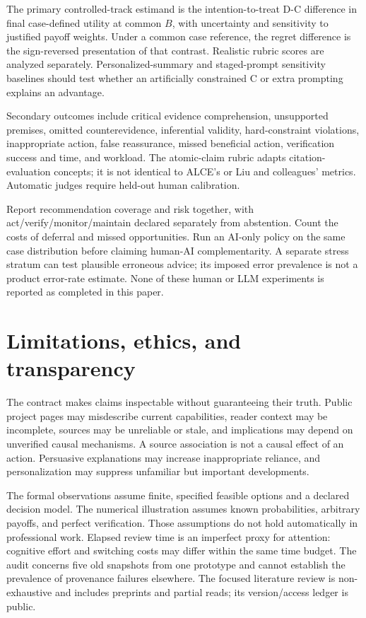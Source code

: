 \documentclass[11pt]{article}
\begin{document}
The primary controlled-track estimand is the intention-to-treat D-C difference in final case-defined utility at common $B$, with uncertainty and sensitivity to justified payoff weights. Under a common case reference, the regret difference is the sign-reversed presentation of that contrast. Realistic rubric scores are analyzed separately. Personalized-summary and staged-prompt sensitivity baselines should test whether an artificially constrained C or extra prompting explains an advantage.

Secondary outcomes include critical evidence comprehension, unsupported premises, omitted counterevidence, inferential validity, hard-constraint violations, inappropriate action, false reassurance, missed beneficial action, verification success and time, and workload. The atomic-claim rubric adapts citation-evaluation concepts; it is not identical to ALCE's or Liu and colleagues' metrics. Automatic judges require held-out human calibration.

Report recommendation coverage and risk together, with act/verify/monitor/maintain declared separately from abstention. Count the costs of deferral and missed opportunities. Run an AI-only policy on the same case distribution before claiming human-AI complementarity. A separate stress stratum can test plausible erroneous advice; its imposed error prevalence is not a product error-rate estimate. None of these human or LLM experiments is reported as completed in this paper.

\section{Limitations, ethics, and transparency}

The contract makes claims inspectable without guaranteeing their truth. Public project pages may misdescribe current capabilities, reader context may be incomplete, sources may be unreliable or stale, and implications may depend on unverified causal mechanisms. A source association is not a causal effect of an action. Persuasive explanations may increase inappropriate reliance, and personalization may suppress unfamiliar but important developments.

The formal observations assume finite, specified feasible options and a declared decision model. The numerical illustration assumes known probabilities, arbitrary payoffs, and perfect verification. Those assumptions do not hold automatically in professional work. Elapsed review time is an imperfect proxy for attention: cognitive effort and switching costs may differ within the same time budget. The audit concerns five old snapshots from one prototype and cannot establish the prevalence of provenance failures elsewhere. The focused literature review is non-exhaustive and includes preprints and partial reads; its version/access ledger is public.
\end{document}
